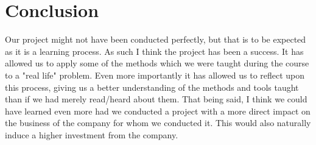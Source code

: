 \section*{Conclusion}
Our project might not have been conducted perfectly, but that is to be expected as it is a learning process.
As such I think the project has been a success.
It has allowed us to apply some of the methods which we were taught during the course to a "real life" problem.
Even more importantly it has allowed us to reflect upon this process, giving us a better understanding of the methods and tools taught than if we had merely read/heard about them.
That being said, I think we could have learned even more had we conducted a project with a more direct impact on the business of the company for whom we conducted it. 
This would also naturally induce a higher investment from the company.